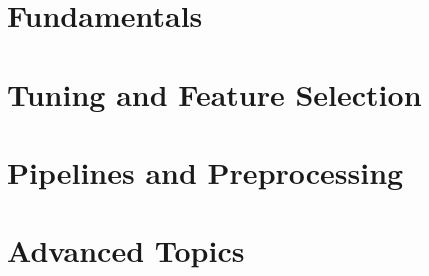 \documentclass[
  letterpaper,
  krantz2]{krantz}
\begin{document}
\mainmatter




\part{Fundamentals}




\part{Tuning and Feature Selection}





\part{Pipelines and Preprocessing}





\part{Advanced Topics}







\backmatter



\printindex
\end{document}
